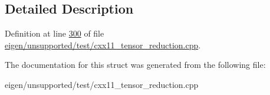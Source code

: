 \subsection{Detailed Description}


Definition at line \hyperlink{eigen_2unsupported_2test_2cxx11__tensor__reduction_8cpp_source_l00300}{300} of file \hyperlink{eigen_2unsupported_2test_2cxx11__tensor__reduction_8cpp_source}{eigen/unsupported/test/cxx11\+\_\+tensor\+\_\+reduction.\+cpp}.



The documentation for this struct was generated from the following file\+:\begin{DoxyCompactItemize}
\item 
eigen/unsupported/test/cxx11\+\_\+tensor\+\_\+reduction.\+cpp\end{DoxyCompactItemize}
